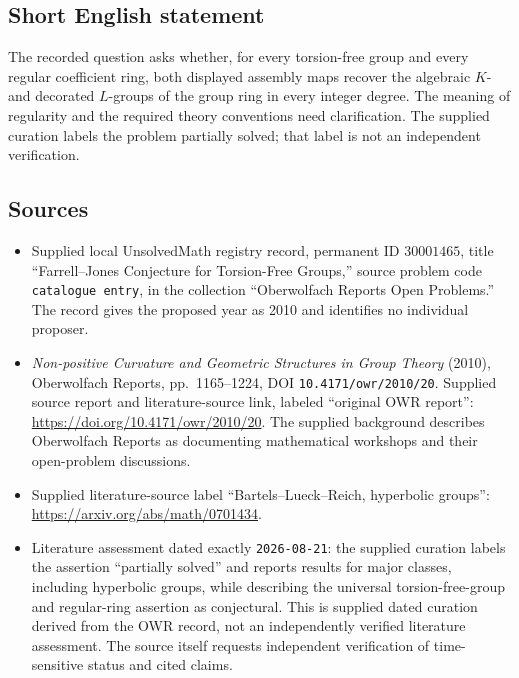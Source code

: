 \documentclass[11pt]{article}
\begin{document}
\subsection{Short English statement}
The recorded question asks whether, for every torsion-free group and every regular coefficient ring, both displayed assembly maps recover the algebraic \(K\)- and decorated \(L\)-groups of the group ring in every integer degree. The meaning of regularity and the required theory conventions need clarification. The supplied curation labels the problem partially solved; that label is not an independent verification.
\subsection{Sources}
\begin{itemize}
\item Supplied local UnsolvedMath registry record, permanent ID \(30001465\), title ``Farrell--Jones Conjecture for Torsion-Free Groups,'' source problem code \texttt{catalogue entry}, in the collection ``Oberwolfach Reports Open Problems.'' The record gives the proposed year as 2010 and identifies no individual proposer.
\item \emph{Non-positive Curvature and Geometric Structures in Group Theory} (2010), Oberwolfach Reports, pp.\ 1165--1224, DOI \texttt{10.4171/owr/2010/20}. Supplied source report and literature-source link, labeled ``original OWR report'': \url{https://doi.org/10.4171/owr/2010/20}. The supplied background describes Oberwolfach Reports as documenting mathematical workshops and their open-problem discussions.
\item Supplied literature-source label ``Bartels--Lueck--Reich, hyperbolic groups'': \url{https://arxiv.org/abs/math/0701434}.
\item Literature assessment dated exactly \texttt{2026-08-21}: the supplied curation labels the assertion ``partially solved'' and reports results for major classes, including hyperbolic groups, while describing the universal torsion-free-group and regular-ring assertion as conjectural. This is supplied dated curation derived from the OWR record, not an independently verified literature assessment. The source itself requests independent verification of time-sensitive status and cited claims.
\end{itemize}
\end{document}
